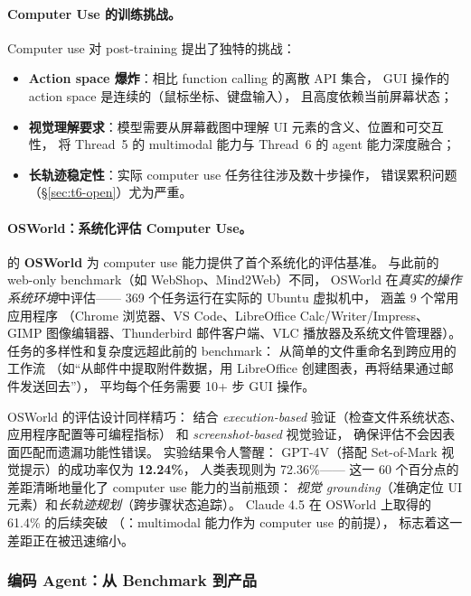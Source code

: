 \paragraph{Computer Use 的训练挑战。}
Computer use 对 post-training 提出了独特的挑战：
\begin{itemize}[leftmargin=2em]
  \item \textbf{Action space 爆炸}：相比 function calling 的离散 API 集合，
    GUI 操作的 action space 是连续的（鼠标坐标、键盘输入），
    且高度依赖当前屏幕状态；
  \item \textbf{视觉理解要求}：模型需要从屏幕截图中理解 UI 元素的含义、位置和可交互性，
    将 Thread~5 的 multimodal 能力与 Thread~6 的 agent 能力深度融合；
  \item \textbf{长轨迹稳定性}：实际 computer use 任务往往涉及数十步操作，
    错误累积问题（\S\ref{sec:t6-open}）尤为严重。
\end{itemize}

\paragraph{OSWorld：系统化评估 Computer Use。}
\citet{xie2024osworld} 的 \textbf{OSWorld}
为 computer use 能力提供了首个系统化的评估基准。
与此前的 web-only benchmark（如 WebShop、Mind2Web）不同，
OSWorld 在\emph{真实的操作系统环境}中评估——
369 个任务运行在实际的 Ubuntu 虚拟机中，
涵盖 9 个常用应用程序
（Chrome 浏览器、VS Code、LibreOffice Calc/Writer/Impress、
GIMP 图像编辑器、Thunderbird 邮件客户端、VLC 播放器及系统文件管理器）。
任务的多样性和复杂度远超此前的 benchmark：
从简单的文件重命名到跨应用的工作流
（如``从邮件中提取附件数据，用 LibreOffice 创建图表，再将结果通过邮件发送回去''），
平均每个任务需要 10+ 步 GUI 操作。

OSWorld 的评估设计同样精巧：
结合 \emph{execution-based} 验证（检查文件系统状态、应用程序配置等可编程指标）
和 \emph{screenshot-based} 视觉验证，
确保评估不会因表面匹配而遗漏功能性错误。
实验结果令人警醒：
GPT-4V（搭配 Set-of-Mark 视觉提示）的成功率仅为 \textbf{12.24\%}，
人类表现则为 72.36\%——
这一 60 个百分点的差距清晰地量化了 computer use 能力的当前瓶颈：
\emph{视觉 grounding}（准确定位 UI 元素）和\emph{长轨迹规划}（跨步骤状态追踪）。
Claude 4.5 在 OSWorld 上取得的 61.4\% 的后续突破
（：multimodal 能力作为 computer use 的前提），
标志着这一差距正在被迅速缩小。

\subsubsection{编码 Agent：从 Benchmark 到产品}

